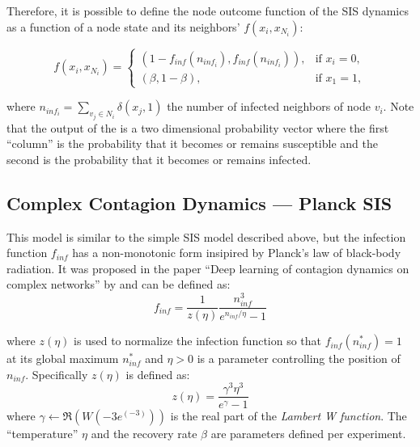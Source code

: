 Therefore, it is possible to define the node outcome function of the SIS
dynamics as a function of a node state and its neighbors' $f(x_i, x_{N_i})$:

\begin{equation}
  \label{eq:sis}
  f(x_i, x_{N_i}) = \begin{cases}
                      (1 - f_{inf}(n_{inf_i}), f_{inf}(n_{inf_i})), &\text{if } x_i=0, \\
                       (\beta, 1 - \beta), & \text{if } x_1 = 1,                                                          
                    \end{cases}
\end{equation}

where $n_{inf_i} = \sum_{v_j \in N_i}\delta (x_j, 1)$ the number of infected
neighbors of node $v_i$. Note that the output of the  is a two
dimensional probability vector where the first ``column'' is the probability that it
becomes or remains susceptible and the second is the probability that it becomes
or remains infected.

\subsection{Complex Contagion Dynamics --- Planck SIS}\label{sec:planck}

This model is similar to the simple SIS model described above, but the
infection function $f_{inf}$ has a non-monotonic form insipired by
Planck's law of black-body radiation. It was proposed in the paper
``Deep learning of contagion dynamics on complex networks'' by
\citet{murphy} and can be defined as:
\begin{equation}
  \label{eq:plank}
  f_{inf} = \frac{1}{z(\eta)} \frac{n_{inf}^3}{e^{n_{inf}/\eta}-1}
\end{equation}

where $z(\eta)$ is used to normalize the infection function so
that $f_{inf}(n_{inf}^*)=1$ at its global maximum $n_{inf}^*$ and
$\eta>0$ is a parameter controlling the position of $n_{inf}$.
Specifically $z(\eta)$ is defined as:
\begin{equation}
  \label{eq:zeta}
  z(\eta) = \frac{\gamma^3  \eta^3}{e^\gamma - 1}
\end{equation}
where $\gamma \gets \Re(W(-3e^{(-3)}))$ is the real part of the
\textit{Lambert W function}. The ``temperature'' $\eta$ and the
recovery rate $\beta$ are parameters defined per experiment.

